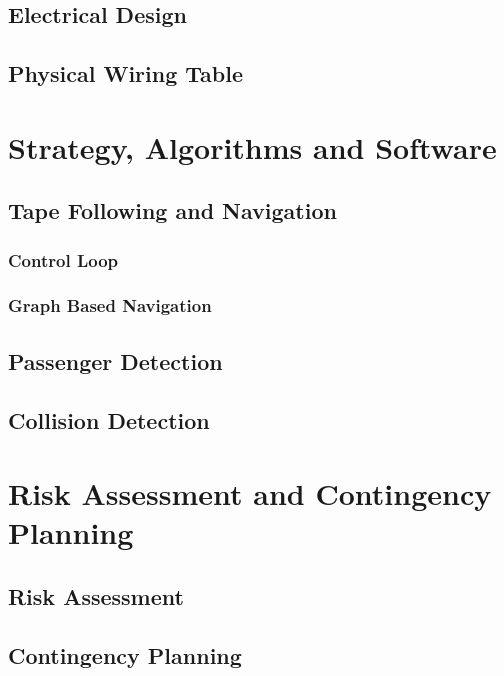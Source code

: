 \documentclass[12pt]{article}
\begin{document}
\subsection{Electrical Design}
\subsection{Physical Wiring Table}

\section{Strategy, Algorithms and Software}
\subsection{Tape Following and Navigation}
\subsubsection{Control Loop}
\subsubsection{Graph Based Navigation}
\subsection{Passenger Detection}
\subsection{Collision Detection}

\section{Risk Assessment and Contingency Planning}
\subsection{Risk Assessment}
\subsection{Contingency Planning}
\hspace*{-8pt}
\end{document}
